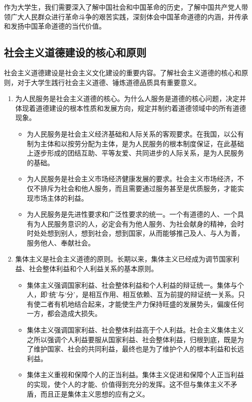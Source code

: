 作为大学生，我们需要深入了解中国社会和中国革命的历史，了解中国共产党人带领广大人民群众进行革命斗争的艰苦实践，深刻体会中国革命道德的内涵，并传承和发扬中国革命道德的当代价值。

\subsection{社会主义道德建设的核心和原则}
社会主义道德建设是社会主义文化建设的重要内容。了解社会主义道德的核心和原则，对于大学生践行社会主义道德、锤炼道德品质具有重要意义。
\begin{enumerate}
\item 为人民服务是社会主义道德的核心。为什么人服务是道德的核心问题，决定并体现着道德建设的根本性质和发展方向，规定并制约着道德领域中的所有道德现象。
\begin{itemize}
\item 为人民服务是社会主义经济基础和人际关系的客观要求。在我国，以公有制为主体和以按劳分配为主体，是为人民服务的根本制度保证，在此基础上逐步形成的团结互助、平等友爱、共同进步的人际关系，是为人民服务的基础。
\item 为人民服务是社会主义市场经济健康发展的要求。社会主义市场经济，不仅不排斥为社会和他人服务，而且需要通过服务甚至是优质服务，才能实现市场主体的利益。
\item 为人民服务是先进性要求和广泛性要求的统一。一个有道德的人、一个具有为人民服务意识的人，必定会有为他人服务、为社会献身的精神，会时时处处想到别人，想到社会，想到国家，从而能够推己及人、与人为善，服务他人、奉献社会。
\end{itemize}
\item 集体主义是社会主义道德的原则。长期以来，集体主义已经成为调节国家利益、社会整体利益和个人利益关系的基本原则。
\begin{itemize}
\item 集体主义强调国家利益、社会整体利益和个人利益的辩证统一。集体与个人，即‘统’与‘分’，是相互作用、相互依赖、互为前提的辩证统一关系。只有使二者有机地结合起来，才能使生产力保持旺盛的发展势头，偏废任何一方，都会造成大损失。
\item 集体主义强调国家利益、社会整体利益高于个人利益。社会主义集体主义之所以强调个人利益要服从国家利益、社会整体利益，归根到底，既是为了维护国家、社会的共同利益，最终也是为了维护个人的根本利益和长远利益。
\item 集体主义重视和保障个人的正当利益。集体主义促进和保障个人正当利益的实现，使个人的才能、价值得到充分的发挥。这不但与集体主义不矛盾，而且正是集体主义思想的应有之义。
\end{itemize}
\end{enumerate}

